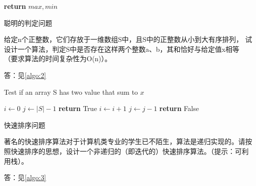 \documentclass{ctexart}
\begin{document}
\begin{outline}[enumerate]
\begin{algorithm}
\begin{algorithmic}[1]
            \State \textbf{return} $max, min$
        \EndProcedure
    \end{algorithmic}
\end{algorithm}

\1 聪明的判定问题

给定n个正整数，它们存放于一维数组S中，且S中的正整数从小到大有序排列，
试设计一个算法，判定S中是否存在这样两个整数a、b，其和恰好与给定值x相等（要求算法的时间复杂性为O(n)）。

答：见\cref{algo:2}

\begin{algorithm}
    \caption{Test if an array S has two value that sum to $x$}
    \begin{algorithmic}[1]
        \label{algo:2}
         
            \State $i \gets 0$
            \State $j \gets |S| - 1$
                    \State \textbf{return} True
                    \State $i \gets i + 1$
                \Else
                    \State $j \gets j - 1$
                \EndIf
            \EndWhile
            \State \textbf{return} False
        \EndProcedure
    \end{algorithmic}
\end{algorithm}


\1 快速排序问题

著名的快速排序算法对于计算机类专业的学生已不陌生，算法是递归实现的。请按照快速排序的思想，设计一个非递归的（即迭代的）快速排序算法。（提示：可利用栈）。

答：见\cref{algo:3}


\end{outline}
\end{document}
